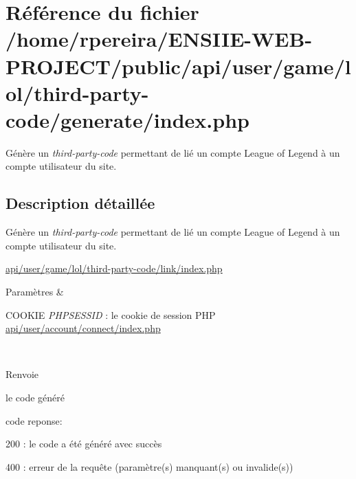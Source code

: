 \hypertarget{game_2lol_2third-party-code_2generate_2index_8php}{}\section{Référence du fichier /home/rpereira/\+E\+N\+S\+I\+I\+E-\/\+W\+E\+B-\/\+P\+R\+O\+J\+E\+C\+T/public/api/user/game/lol/third-\/party-\/code/generate/index.php}
\label{game_2lol_2third-party-code_2generate_2index_8php}


Génère un {\itshape third-\/party-\/code} permettant de lié un compte League of Legend à un compte utilisateur du site.  




\subsection{Description détaillée}
Génère un {\itshape third-\/party-\/code} permettant de lié un compte League of Legend à un compte utilisateur du site. 

\hyperlink{game_2lol_2third-party-code_2link_2index_8php}{api/user/game/lol/third-\/party-\/code/link/index.\+php} 
\begin{DoxyParams}{Paramètres}
{\em } & 
\begin{DoxyItemize}
\item C\+O\+O\+K\+IE {\itshape P\+H\+P\+S\+E\+S\+S\+ID} \+: le cookie de session P\+HP \hyperlink{account_2connect_2index_8php}{api/user/account/connect/index.\+php} 
\end{DoxyItemize}\\
\hline
\end{DoxyParams}
\begin{DoxyReturn}{Renvoie}

\begin{DoxyItemize}
\item le code généré
\item code reponse\+:
\begin{DoxyItemize}
\item 200 \+: le code a été généré avec succès
\item 400 \+: erreur de la requête (paramètre(s) manquant(s) ou invalide(s)) 
\end{DoxyItemize}
\end{DoxyItemize}
\end{DoxyReturn}
